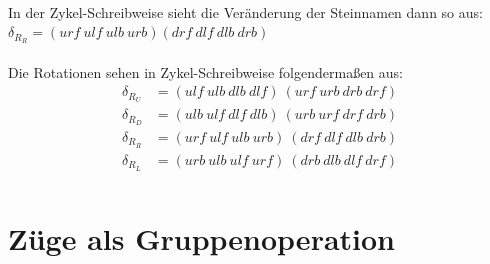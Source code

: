 \documentclass[12pt,a4paper, usenames, dvipsnames]{scrartcl}
\begin{document}
\\
In der Zykel-Schreibweise sieht die Veränderung der Steinnamen dann so aus: \\
$\delta_{R_R}=(urf \ ulf \ ulb \ urb)(drf \ dlf \ dlb \ drb )$ \\
\\
Die Rotationen sehen in Zykel-Schreibweise folgendermaßen aus:
\begin{align*}
\delta_{R_U} & =(ulf \ ulb \ dlb \ dlf) \ (urf \ urb \ drb \ drf) \\
\delta_{R_D} & =(ulb \ ulf \ dlf \ dlb) \ (urb \ urf \ drf \ drb) \\
\delta_{R_R} & =(urf \ ulf \ ulb \ urb) \ (drf \ dlf \ dlb \ drb ) \\
\delta_{R_L} & =(urb \ ulb \ ulf \ urf) \ (drb \ dlb \ dlf \ drf) \\
\end{align*}













\newpage
\section{Züge als Gruppenoperation}
\end{document}

